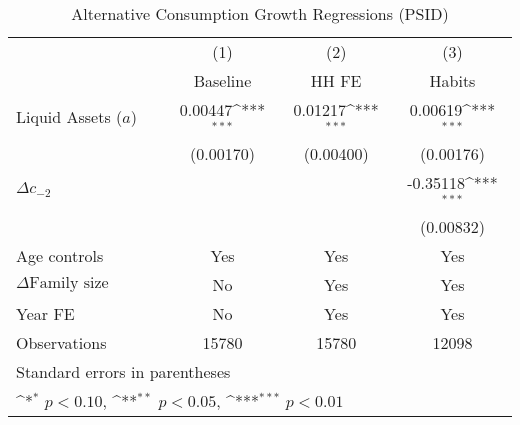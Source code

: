 {
\def\sym#1{\ifmmode^{#1}\else\(^{#1}\)\fi}
\begin{longtable}{l*{3}{c}}
\caption{Alternative Consumption Growth Regressions (PSID)} \label{ee-psid} \\
\toprule\endfirsthead\midrule\endhead\midrule\endfoot\endlastfoot
                    &\multicolumn{1}{c}{(1)}&\multicolumn{1}{c}{(2)}&\multicolumn{1}{c}{(3)}\\
                    &\multicolumn{1}{c}{Baseline}&\multicolumn{1}{c}{HH FE}&\multicolumn{1}{c}{Habits}\\
\midrule
Liquid Assets ($ a $) $\;\;\;\;\;\;\;\;\;\;\;\;$&     0.00447\sym{***}&     0.01217\sym{***}&     0.00619\sym{***}\\
                    &   (0.00170)         &   (0.00400)         &   (0.00176)         \\
\addlinespace
$\Delta c_{-2}$     &                     &                     &    -0.35118\sym{***}\\
                    &                     &                     &   (0.00832)         \\
\addlinespace
Age controls        &         Yes         &         Yes         &         Yes         \\
\addlinespace
$\Delta\text{Family size}$ &          No         &         Yes         &         Yes         \\
\addlinespace
Year FE             &          No         &         Yes         &         Yes         \\
\midrule
Observations        &       15780         &       15780         &       12098         \\
\bottomrule
\multicolumn{4}{l}{\footnotesize Standard errors in parentheses}\\
\multicolumn{4}{l}{\footnotesize \sym{*} \(p<0.10\), \sym{**} \(p<0.05\), \sym{***} \(p<0.01\)}\\
\end{longtable}
}
